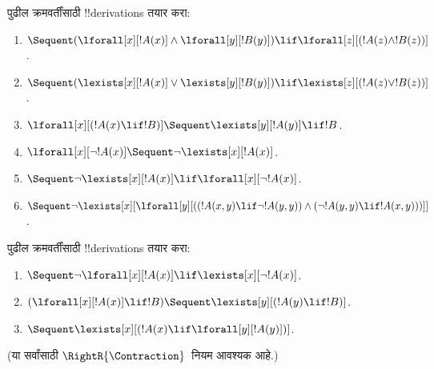\documentclass[../../../include/open-logic-section]{subfiles}
\begin{document}
\begin{prob}
पुढील क्रमवर्तींसाठी !!{derivation}s तयार करा:
\begin{enumerate}
\item $\Sequent (\lforall[x][!A(x)] \land \lforall[y][!B(y)]) \lif
\lforall[z][(!A(z) \land !B(z))]$.
\item $\Sequent (\lexists[x][!A(x)] \lor \lexists[y][!B(y)]) \lif
\lexists[z][(!A(z) \lor !B(z))]$.
\item $\lforall[x][(!A(x) \lif !B)] \Sequent \lexists[y][!A(y)] \lif !B$.
\item $\lforall[x][\lnot !A(x)] \Sequent \lnot\lexists[x][!A(x)]$.
\item $\Sequent \lnot\lexists[x][!A(x)] \lif \lforall[x][\lnot !A(x)]$.
\item $\Sequent \lnot\lexists[x][\lforall[y][((!A(x,y) \lif \lnot
!A(y,y)) \land (\lnot !A(y,y) \lif !A(x,y)))]]$.
\end{enumerate}
\end{prob}

\begin{prob}
पुढील क्रमवर्तींसाठी !!{derivation}s तयार करा:
\begin{enumerate}
\item $\Sequent \lnot\lforall[x][!A(x)] \lif \lexists[x][\lnot!A(x)]$.
\item $(\lforall[x][!A(x)] \lif !B) \Sequent \lexists[y][(!A(y) \lif !B)]$.
\item $\Sequent \lexists[x][(!A(x) \lif \lforall[y][!A(y)])]$.
\end{enumerate}
(या सर्वांसाठी $\RightR{\Contraction}$~नियम आवश्यक आहे.)
\end{prob}
\end{document}

